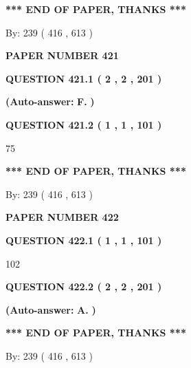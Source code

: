 \documentclass{ctexart}
\begin{document}
 
   
   
   
   
\vspace{1.0in} 
{\textbf{\large{ *** END OF PAPER, THANKS *** }}} 
   
   
\hspace{1.0in} By: 
 239 ( 416 ,  613 )
   
   
   
   
\newpage 
\setcounter{page}{ 
   421001 } 
   
   
 {\textbf{ \Large{ PAPER NUMBER  421  }}}
   
   
   
   
  
  
{\textbf{\large{QUESTION
421.1 
 ( 2 , 2 , 201 )
}}}
 
 
{\textbf{(Auto-answer:}}
{\textbf{\large{
F.}}}
{\textbf{)}}
 
 
  
  
{\textbf{\large{QUESTION
421.2 
 ( 1 , 1 , 101 )
}}}

75
   
   
   
   
\vspace{1.0in} 
{\textbf{\large{ *** END OF PAPER, THANKS *** }}} 
   
   
\hspace{1.0in} By: 
 239 ( 416 ,  613 )
   
   
   
   
\newpage 
\setcounter{page}{ 
   422001 } 
   
   
 {\textbf{ \Large{ PAPER NUMBER  422  }}}
   
   
   
   
  
  
{\textbf{\large{QUESTION
422.1 
 ( 1 , 1 , 101 )
}}}

102
  
  
{\textbf{\large{QUESTION
422.2 
 ( 2 , 2 , 201 )
}}}
 
 
{\textbf{(Auto-answer:}}
{\textbf{\large{
A.}}}
{\textbf{)}}
 
 
   
   
   
   
\vspace{1.0in} 
{\textbf{\large{ *** END OF PAPER, THANKS *** }}} 
   
   
\hspace{1.0in} By: 
 239 ( 416 ,  613 )
   
   
   
   
\newpage 
\setcounter{page}{ 
   423001 } 
   
\end{document}
